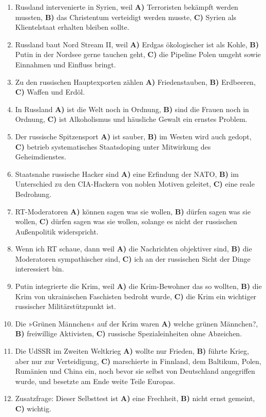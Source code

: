 \begin{enumerate}
\def\labelenumi{\arabic{enumi}.}
\tightlist
\item
  Russland intervenierte in Syrien, weil \textbf{A)} Terroristen
  bekämpft werden mussten, \textbf{B)} das Christen­tum verteidigt
  werden musste, \textbf{C)} Syrien als Klientelstaat erhalten bleiben
  sollte.
\item
  Russland baut Nord Stream II, weil \textbf{A)} Erdgas ökologischer ist
  als Kohle, \textbf{B)} Putin in der Nordsee gerne tauchen geht,
  \textbf{C)} die Pipeline Polen umgeht sowie Einnahmen und Einfluss
  bringt.
\item
  Zu den russischen Hauptexporten zählen \textbf{A)} Friedenstauben,
  \textbf{B)} Erdbeeren, \textbf{C)} Waffen und Erdöl.
\item
  In Russland \textbf{A)} ist die Welt noch in Ordnung, \textbf{B)} sind
  die Frauen noch in Ordnung, \textbf{C)} ist Alkoho­lis­mus und
  häusliche Gewalt ein ernstes Problem.
\item
  Der russische Spitzensport \textbf{A)} ist sauber, \textbf{B)} im
  Westen wird auch gedopt, \textbf{C)} betrieb systema­tisches
  Staatsdoping unter Mitwirkung des Geheimdienstes.
\item
  Staatsnahe russische Hacker sind \textbf{A)} eine Erfindung der NATO,
  \textbf{B)} im Unterschied zu den CIA-Hackern von noblen Motiven
  geleitet, \textbf{C)} eine reale Bedrohung.
\item
  RT-Moderatoren \textbf{A)} können sagen was sie wollen, \textbf{B)}
  dürfen sagen was sie wollen, \textbf{C)} dürfen sagen was sie wollen,
  solange es nicht der russischen Außenpolitik widerspricht.
\item
  Wenn ich RT schaue, dann weil \textbf{A)} die Nachrichten objektiver
  sind, \textbf{B)} die Moderatoren sympathischer sind, \textbf{C)} ich
  an der russischen Sicht der Dinge interessiert bin.
\item
  Putin integrierte die Krim, weil \textbf{A)} die Krim-Bewohner das so
  wollten, \textbf{B)} die Krim von ukrai­ni­schen Faschisten bedroht
  wurde, \textbf{C)} die Krim ein wichtiger russischer Militärstützpunkt
  ist.
\item
  Die »Grünen Männchen« auf der Krim waren \textbf{A)} welche grünen
  Männchen?, \textbf{B)} freiwillige Aktivisten, \textbf{C)} russische
  Spezialeinheiten ohne Abzeichen.
\item
  Die UdSSR im Zweiten Weltkrieg \textbf{A)} wollte nur Frieden,
  \textbf{B)} führte Krieg, aber nur zur Verteidigung, \textbf{C)}
  marschierte in Finnland, dem Baltikum, Polen, Rumänien und China ein,
  noch bevor sie selbst von Deutschland angegriffen wurde, und besetzte
  am Ende weite Teile Europas.
\item
  Zusatzfrage: Dieser Selbsttest ist \textbf{A)} eine Frechheit,
  \textbf{B)} nicht ernst gemeint, \textbf{C)} wichtig.
\end{enumerate}

